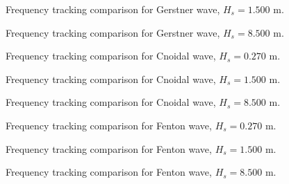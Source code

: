 \documentclass[11pt,letterpaper]{article}
\begin{document}
    \begin{figure}[H]\centering
    \resizebox{\textwidth}{!}{}
    \caption{Frequency tracking comparison for Gerstner wave, $H_s = 1.500$ m.}
    \label{fig:freqtrack_gerstner_medium}
    \end{figure}

    \begin{figure}[H]\centering
    \resizebox{\textwidth}{!}{}
    \caption{Frequency tracking comparison for Gerstner wave, $H_s = 8.500$ m.}
    \label{fig:freqtrack_gerstner_high}
    \end{figure}

    \begin{figure}[H]\centering
    \resizebox{\textwidth}{!}{}
    \caption{Frequency tracking comparison for Cnoidal wave, $H_s = 0.270$ m.}
    \label{fig:freqtrack_cnoidal_low}
    \end{figure}

    \begin{figure}[H]\centering
    \resizebox{\textwidth}{!}{}
    \caption{Frequency tracking comparison for Cnoidal wave, $H_s = 1.500$ m.}
    \label{fig:freqtrack_cnoidal_medium}
    \end{figure}

    \begin{figure}[H]\centering
    \resizebox{\textwidth}{!}{}
    \caption{Frequency tracking comparison for Cnoidal wave, $H_s = 8.500$ m.}
    \label{fig:freqtrack_cnoidal_high}
    \end{figure}

    \begin{figure}[H]\centering
    \resizebox{\textwidth}{!}{}
    \caption{Frequency tracking comparison for Fenton wave, $H_s = 0.270$ m.}
    \label{fig:freqtrack_fenton_low}
    \end{figure}

    \begin{figure}[H]\centering
    \resizebox{\textwidth}{!}{}
    \caption{Frequency tracking comparison for Fenton wave, $H_s = 1.500$ m.}
    \label{fig:freqtrack_fenton_medium}
    \end{figure}

    \begin{figure}[H]\centering
    \resizebox{\textwidth}{!}{}
    \caption{Frequency tracking comparison for Fenton wave, $H_s = 8.500$ m.}
    \label{fig:freqtrack_fenton_high}
    \end{figure}
\end{document}
